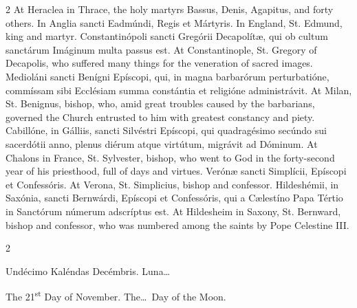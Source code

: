\begin{paracol}{2}
\switchcolumn
{}
At Heraclea in Thrace, the holy 
 martyrs Bassus, Denis, Agapitus, and forty others.
\switchcolumn*
{}
In Anglia sancti 
 Eadmúndi, Regis et Mártyris.
\switchcolumn
{}
In England, St. Edmund, king and 
 martyr.
\switchcolumn*
{}
Constantinópoli sancti 
 Gregórii Decapolítæ, qui ob cultum sanctárum Imáginum multa passus est.
\switchcolumn
{}
At Constantinople, St. Gregory of 
 Decapolis, who suffered many things for the veneration of sacred images.
\switchcolumn*
{}
Medioláni sancti 
 Benígni Epíscopi, qui, in magna barbarórum perturbatióne, commíssam sibi 
 Ecclésiam summa constántia et religióne administrávit.
\switchcolumn
{}
At Milan, St. Benignus, bishop, who, 
 amid great troubles caused by the barbarians, governed the Church entrusted 
 to him with greatest constancy and piety.
\switchcolumn*
{}
Cabillóne, in Gálliis, 
 sancti Silvéstri Epíscopi, qui quadragésimo secúndo sui sacerdótii anno, 
 plenus diérum atque virtútum, migrávit ad Dóminum.
\switchcolumn
{}
At Chalons in France, St. Sylvester, 
 bishop, who went to God in the forty-second year of his priesthood, full of 
 days and virtues.
\switchcolumn*
{}
Verónæ sancti Simplícii, 
 Epíscopi et Confessóris.
\switchcolumn
{}
At Verona, St. Simplicius, bishop 
 and confessor.
\switchcolumn*
{}
Hildeshémii, in Saxónia, 
 sancti Bernwárdi, Epíscopi et Confessóris, qui a Cælestíno Papa Tértio in 
 Sanctórum númerum adscríptus est.
\switchcolumn
{}
At Hildesheim in Saxony, St. 
 Bernward, bishop and confessor, who was numbered among the saints by Pope 
 Celestine III.
\switchcolumn*
{}
\end{paracol}


\begin{paracol}{2}
\begin{center}{\color{gregoriocolor} Undécimo Kaléndas Decémbris. 
 Luna\dots\ }\end{center}
\switchcolumn
{}
\begin{center}{\color{gregoriocolor} The 
 21\textsuperscript{st} Day of 
 November. The\dots\ Day of the Moon.}\end{center}
\end{paracol}

